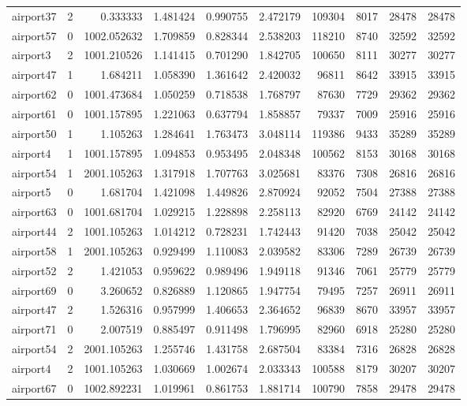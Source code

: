 \begin{longtable}{|l|r|r|r|r|r|r|r|r|r|}
airport37 & 2 & 0.333333 & 1.481424 & 0.990755 & 2.472179 & 109304 & 8017 & 28478 & 28478 \\
airport57 & 0 & 1002.052632 & 1.709859 & 0.828344 & 2.538203 & 118210 & 8740 & 32592 & 32592 \\
airport3 & 2 & 1001.210526 & 1.141415 & 0.701290 & 1.842705 & 100650 & 8111 & 30277 & 30277 \\
airport47 & 1 & 1.684211 & 1.058390 & 1.361642 & 2.420032 & 96811 & 8642 & 33915 & 33915 \\
airport62 & 0 & 1001.473684 & 1.050259 & 0.718538 & 1.768797 & 87630 & 7729 & 29362 & 29362 \\
airport61 & 0 & 1001.157895 & 1.221063 & 0.637794 & 1.858857 & 79337 & 7009 & 25916 & 25916 \\
airport50 & 1 & 1.105263 & 1.284641 & 1.763473 & 3.048114 & 119386 & 9433 & 35289 & 35289 \\
airport4 & 1 & 1001.157895 & 1.094853 & 0.953495 & 2.048348 & 100562 & 8153 & 30168 & 30168 \\
airport54 & 1 & 2001.105263 & 1.317918 & 1.707763 & 3.025681 & 83376 & 7308 & 26816 & 26816 \\
airport5 & 0 & 1.681704 & 1.421098 & 1.449826 & 2.870924 & 92052 & 7504 & 27388 & 27388 \\
airport63 & 0 & 1001.681704 & 1.029215 & 1.228898 & 2.258113 & 82920 & 6769 & 24142 & 24142 \\
airport44 & 2 & 1001.105263 & 1.014212 & 0.728231 & 1.742443 & 91420 & 7038 & 25042 & 25042 \\
airport58 & 1 & 2001.105263 & 0.929499 & 1.110083 & 2.039582 & 83306 & 7289 & 26739 & 26739 \\
airport52 & 2 & 1.421053 & 0.959622 & 0.989496 & 1.949118 & 91346 & 7061 & 25779 & 25779 \\
airport69 & 0 & 3.260652 & 0.826889 & 1.120865 & 1.947754 & 79495 & 7257 & 26911 & 26911 \\
airport47 & 2 & 1.526316 & 0.957999 & 1.406653 & 2.364652 & 96839 & 8670 & 33957 & 33957 \\
airport71 & 0 & 2.007519 & 0.885497 & 0.911498 & 1.796995 & 82960 & 6918 & 25280 & 25280 \\
airport54 & 2 & 2001.105263 & 1.255746 & 1.431758 & 2.687504 & 83384 & 7316 & 26828 & 26828 \\
airport4 & 2 & 1001.105263 & 1.030669 & 1.002674 & 2.033343 & 100588 & 8179 & 30207 & 30207 \\
airport67 & 0 & 1002.892231 & 1.019961 & 0.861753 & 1.881714 & 100790 & 7858 & 29478 & 29478 \\

\end{longtable}

